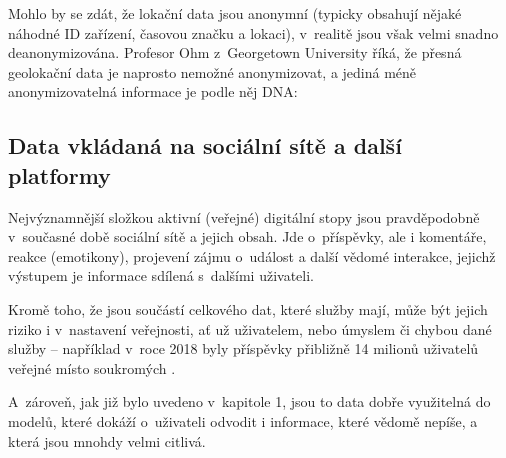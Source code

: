 Mohlo by se zdát, že lokační data jsou anonymní (typicky obsahují nějaké náhodné ID zařízení, časovou značku a lokaci), v~realitě jsou však velmi snadno deanonymizována. Profesor Ohm z~Georgetown University říká, že přesná geolokační data je naprosto nemožné anonymizovat, a jediná méně anonymizovatelná informace je podle něj DNA:

\begin{displayquote}
	\citep{location-data}
\end{displayquote}

\subsection{Data vkládaná na sociální sítě a další platformy}
Nejvýznamnější složkou aktivní (veřejné) digitální stopy jsou pravděpodobně v~současné době sociální sítě a jejich obsah.
Jde o~příspěvky, ale i komentáře, reakce (emotikony), projevení zájmu o~událost a další vědomé interakce, jejichž výstupem je informace sdílená s~dalšími uživateli. 

Kromě toho, že jsou součástí celkového  dat, které služby mají, může být jejich riziko i v~nastavení veřejnosti, ať už uživatelem, nebo úmyslem či chybou dané služby -- například v~roce 2018 byly příspěvky přibližně 14 milionů uživatelů veřejné místo soukromých \citep{facebook-public-posts}.

A~zároveň, jak již bylo uvedeno v~kapitole 1, jsou to data dobře využitelná do modelů, které dokáží o~uživateli odvodit i informace, které vědomě nepíše, a která jsou mnohdy velmi citlivá.

